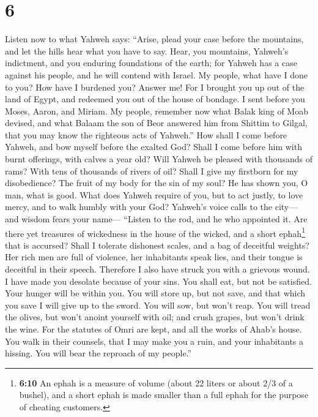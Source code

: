 \hypertarget{section-5}{%
\section{6}\label{section-5}}

 Listen now to what Yahweh says: ``Arise, plead your case
before the mountains, and let the hills hear what you have to say.
 Hear, you mountains, Yahweh's indictment, and you
enduring foundations of the earth; for Yahweh has a case against his
people, and he will contend with Israel.  My people, what
have I done to you? How have I burdened you? Answer me! 
For I brought you up out of the land of Egypt, and redeemed you out of
the house of bondage. I sent before you Moses, Aaron, and Miriam.
 My people, remember now what Balak king of Moab devised,
and what Balaam the son of Beor answered him from Shittim to Gilgal,
that you may know the righteous acts of Yahweh.''  How
shall I come before Yahweh, and bow myself before the exalted God? Shall
I come before him with burnt offerings, with calves a year old?
 Will Yahweh be pleased with thousands of rams? With tens
of thousands of rivers of oil? Shall I give my firstborn for my
disobedience? The fruit of my body for the sin of my soul?
 He has shown you, O man, what is good. What does Yahweh
require of you, but to act justly, to love mercy, and to walk humbly
with your God?  Yahweh's voice calls to the city--- and
wisdom fears your name--- ``Listen to the rod, and he who appointed it.
 Are there yet treasures of wickedness in the house of
the wicked, and a short ephah\footnote{\textbf{6:10} An ephah is a
  measure of volume (about 22 liters or about 2/3 of a bushel), and a
  short ephah is made smaller than a full ephah for the purpose of
  cheating customers.} that is accursed?  Shall I
tolerate dishonest scales, and a bag of deceitful weights?
 Her rich men are full of violence, her inhabitants speak
lies, and their tongue is deceitful in their speech. 
Therefore I also have struck you with a grievous wound. I have made you
desolate because of your sins.  You shall eat, but not be
satisfied. Your hunger will be within you. You will store up, but not
save, and that which you save I will give up to the sword.
 You will sow, but won't reap. You will tread the olives,
but won't anoint yourself with oil; and crush grapes, but won't drink
the wine.  For the statutes of Omri are kept, and all the
works of Ahab's house. You walk in their counsels, that I may make you a
ruin, and your inhabitants a hissing. You will bear the reproach of my
people.''

